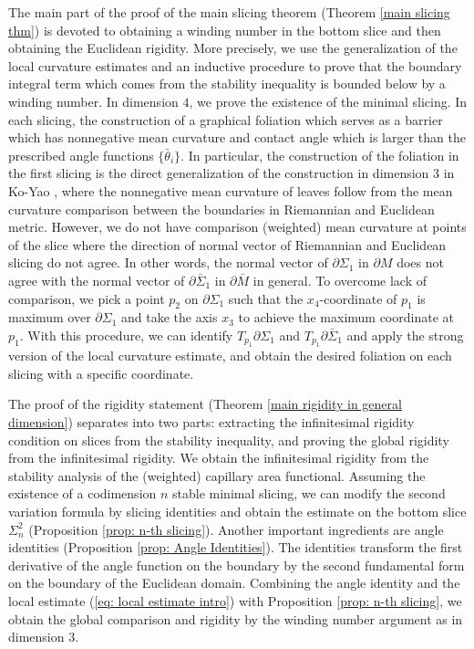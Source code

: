 \documentclass[11pt,letterpaper]{amsart}
\begin{document}
The main part of the proof of the main slicing theorem (Theorem \ref{main slicing thm}) is devoted to obtaining a winding number in the bottom slice and then obtaining the Euclidean rigidity. More precisely, we use the generalization of the local curvature estimates and an inductive procedure to prove that the boundary integral term which comes from the stability inequality is bounded below by a winding number. 
In dimension $4$, we prove the existence of the minimal slicing. In each slicing, the construction of a graphical foliation which serves as a barrier which has nonnegative mean curvature and contact angle which is larger than the prescribed angle functions $\{ \bar{\theta}_{i} \}$. In particular, the construction of the foliation in the first slicing is the direct generalization of the construction in dimension $3$ in Ko-Yao \cite{koyao}, where the nonnegative mean curvature of leaves follow from the mean curvature comparison between the boundaries in Riemannian and Euclidean metric. However, we do not have comparison (weighted) mean curvature at points of the slice where the direction of normal vector of Riemannian and Euclidean slicing do not agree. In other words, the normal vector of $\partial \Sigma_{1}$ in $\partial M$ does not agree with the normal vector of $\partial \bar{\Sigma}_{1}$ in $\partial \bar{M}$ in general. To overcome lack of comparison, we pick a point $p_{2}$ on $\partial \Sigma_{1}$ such that the $x_{4}$-coordinate of $p_{1}$ is maximum over $\partial \Sigma_{1}$ and take the axis $x_{3}$ to achieve the maximum coordinate at $p_{1}$. With this procedure, we can identify $T_{p_{1}} \partial \Sigma_{1}$ and $T_{p_{1}} \partial \bar{\Sigma}_{1}$ and apply the strong version of the local curvature estimate, and obtain the desired foliation on each slicing with a specific coordinate. 

The proof of the rigidity statement (Theorem \ref{main rigidity in general dimension}) separates into two parts: extracting the infinitesimal rigidity condition on slices from the stability inequality, and proving the global rigidity from the infinitesimal rigidity. We obtain the infinitesimal rigidity from the stability analysis of the (weighted) capillary area functional. Assuming the existence of a codimension $n$ stable minimal slicing, we can modify the second variation formula by slicing identities and obtain the estimate on the bottom slice $\Sigma_{n}^{2}$ (Proposition \ref{prop: n-th slicing}). Another important ingredients are angle identities (Proposition \ref{prop: Angle Identities}). The identities transform the first derivative of the angle function on the boundary by the second fundamental form on the boundary of the Euclidean domain. Combining the angle identity and the local estimate (\ref{eq: local estimate intro}) with Proposition \ref{prop: n-th slicing}, we obtain the global comparison and rigidity by the winding number argument as in dimension $3$.
\end{document}
